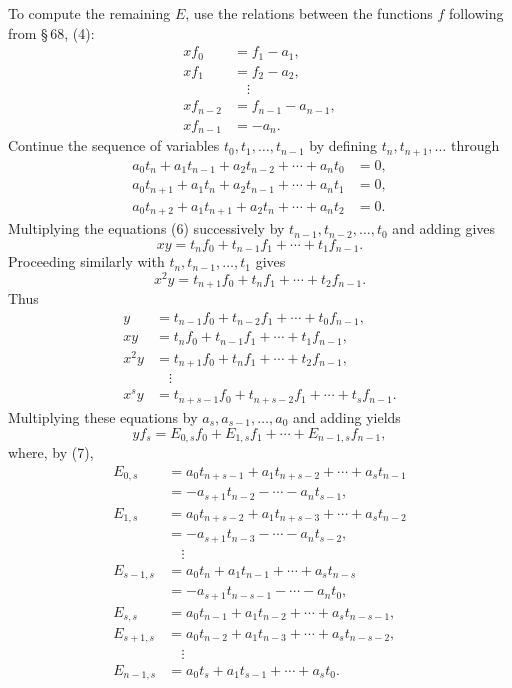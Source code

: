 \documentclass[11pt]{article}
\begin{document}
To compute the remaining $E$, use the relations between the functions $f$ following from \S\,68, (4):
\begin{equation}
\begin{aligned}
 xf_0&=f_1-a_1,\\
 xf_1&=f_2-a_2,\\
 &\quad\vdots\\
 xf_{n-2}&=f_{n-1}-a_{n-1},\\
 xf_{n-1}&=-a_n.
\end{aligned}
\tag{6}
\end{equation}
Continue the sequence of variables $t_0,t_1,\ldots,t_{n-1}$ by defining $t_n,t_{n+1},\ldots$ through
\begin{equation}
\begin{aligned}
 a_0t_n+a_1t_{n-1}+a_2t_{n-2}+\cdots+a_nt_0&=0,\\
 a_0t_{n+1}+a_1t_n+a_2t_{n-1}+\cdots+a_nt_1&=0,\\
 a_0t_{n+2}+a_1t_{n+1}+a_2t_n+\cdots+a_nt_2&=0.
\end{aligned}
\tag{7}
\end{equation}
Multiplying the equations (6) successively by $t_{n-1},t_{n-2},\ldots,t_0$ and adding gives
\[
 xy=t_nf_0+t_{n-1}f_1+\cdots+t_1f_{n-1}.
\]
Proceeding similarly with $t_n,t_{n-1},\ldots,t_1$ gives
\[
 x^2y=t_{n+1}f_0+t_nf_1+\cdots+t_2f_{n-1}.
\]
Thus
\begin{equation}
\begin{aligned}
 y&=t_{n-1}f_0+t_{n-2}f_1+\cdots+t_0f_{n-1},\\
 xy&=t_nf_0+t_{n-1}f_1+\cdots+t_1f_{n-1},\\
 x^2y&=t_{n+1}f_0+t_nf_1+\cdots+t_2f_{n-1},\\
 &\quad\vdots\\
 x^sy&=t_{n+s-1}f_0+t_{n+s-2}f_1+\cdots+t_sf_{n-1}.
\end{aligned}
\tag{8}
\end{equation}
Multiplying these equations by $a_s,a_{s-1},\ldots,a_0$ and adding yields
\[
 yf_s=E_{0,s}f_0+E_{1,s}f_1+\cdots+E_{n-1,s}f_{n-1},
\]
where, by (7),
\begin{equation}
\begin{aligned}
E_{0,s}&=a_0t_{n+s-1}+a_1t_{n+s-2}+\cdots+a_st_{n-1}\\
&= -a_{s+1}t_{n-2}-\cdots-a_nt_{s-1},\\[0.25em]
E_{1,s}&=a_0t_{n+s-2}+a_1t_{n+s-3}+\cdots+a_st_{n-2}\\
&= -a_{s+1}t_{n-3}-\cdots-a_nt_{s-2},\\
&\quad\vdots\\
E_{s-1,s}&=a_0t_n+a_1t_{n-1}+\cdots+a_st_{n-s}\\
&= -a_{s+1}t_{n-s-1}-\cdots-a_nt_0,\\[0.25em]
E_{s,s}&=a_0t_{n-1}+a_1t_{n-2}+\cdots+a_st_{n-s-1},\\
E_{s+1,s}&=a_0t_{n-2}+a_1t_{n-3}+\cdots+a_st_{n-s-2},\\
&\quad\vdots\\
E_{n-1,s}&=a_0t_s+a_1t_{s-1}+\cdots+a_st_0.
\end{aligned}
\tag{9}
\end{equation}
\end{document}
